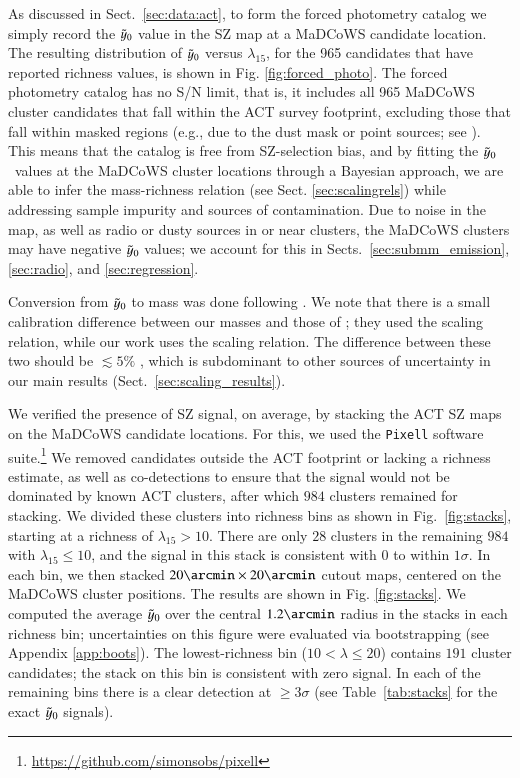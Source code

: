 \documentclass[longauth]{aa} %
\newcommand{\madcows}{MaDCoWS\xspace}
\newcommand{\yc}{$\Tilde{\vary}_0$\xspace}
\begin{document}
As discussed in Sect.~\ref{sec:data:act}, to form the forced photometry catalog we simply record the \yc value in the SZ map at a \madcows candidate location. The resulting distribution of \yc versus $\lambda_{15}$, for the 965 candidates that have reported richness values, is shown in Fig. \ref{fig:forced_photo}. 
The forced photometry catalog has no S/N limit, that is, it includes all 965 MaDCoWS cluster candidates that fall within the ACT survey footprint, excluding those that fall within masked regions (e.g., due to the dust mask or point sources; see \citealt{Hilton2021}). This means that the catalog is free from SZ-selection bias, and 
by fitting the \yc\ values at the MaDCoWS cluster locations through a Bayesian approach, we are able to infer the mass-richness relation (see Sect. \ref{sec:scalingrels}) while addressing sample impurity and sources of contamination. Due to noise in the map, as well as radio or dusty sources in or near clusters, the \madcows clusters may have negative \yc values; we account for this in Sects.~\ref{sec:submm_emission}, \ref{sec:radio}, and \ref{sec:regression}.

Conversion from \yc to mass was done following \citet{Hilton2021}. We note that there is a small calibration difference between our masses and those of \citet{Gonzalez2019}; they used the \citet{Andersson2011} scaling relation, while our work uses the \citet{Arnaud2010} scaling relation. The difference between these two should be $\lesssim 5\%$ \citep{Andersson2011}, which is subdominant to other sources of uncertainty in our main results (Sect.~\ref{sec:scaling_results}).

We verified the presence of SZ signal, on average, by stacking the ACT SZ maps on the MaDCoWS candidate locations.  For this, we used the {\tt Pixell} software suite.\footnote{\url{https://github.com/simonsobs/pixell}} We removed candidates outside the ACT footprint or lacking a richness estimate, as well as co-detections to ensure that the signal would not be dominated by known ACT clusters, after which $984$ clusters remained for stacking. We divided these clusters into richness bins as shown in Fig.~\ref{fig:stacks}, starting at a richness of $\lambda_{15} > 10$. There are only $28$ clusters in the remaining $984$ with $\lambda_{15} \leq 10$, and the signal in this stack is consistent with $0$ to within $1\sigma$. In each bin, we then stacked $20\arcmin \times 20\arcmin$ cutout maps, centered on the MaDCoWS cluster positions. The results are shown in Fig. \ref{fig:stacks}. We computed the average \yc over the central $1.2\arcmin$ radius in the stacks in each richness bin; uncertainties on this figure were evaluated via bootstrapping (see Appendix \ref{app:boots}). The lowest-richness bin ($10 < \lambda \leq 20$) contains $191$ cluster candidates; the stack on this bin is consistent with zero signal. In each of the remaining bins there is a clear detection at $\geq 3\sigma$ (see Table~\ref{tab:stacks} for the exact \yc signals).
\end{document}
